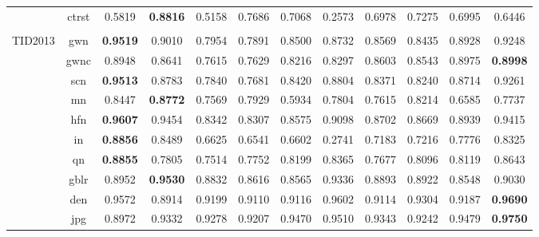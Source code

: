 \documentclass[11pt,a4paper]{article}
\begin{document}
\begin{table}[!htb]
\begin{scriptsize}
\begin{threeparttable}
\begin{tabular}{*{12}{c}}
& ctrst & 0.5819 & \cellcolor{red!25}\textbf{0.8816} & 0.5158 & 0.7686 & 0.7068 & \cellcolor{green!25}0.2573 & 0.6978 & 0.7275 & 0.6995 & 0.6446\\
\\
\multirow{24}{*}{TID2013} & gwn & \textbf{0.9519} & 0.9010 & \cellcolor{green!25}0.7954 & \cellcolor{green!25}0.7891 & \cellcolor{green!25}0.8500 & \cellcolor{green!25}0.8732 & \cellcolor{green!25}0.8569 & \cellcolor{green!25}0.8435 & 0.8928 & 0.9248\\
& gwnc & 0.8948 & 0.8641 & \cellcolor{green!25}0.7615 & \cellcolor{green!25}0.7629 & \cellcolor{green!25}0.8216 & \cellcolor{green!25}0.8297 & 0.8603 & 0.8543 & 0.8975 & \textbf{0.8998}\\
& scn & \textbf{0.9513} & \cellcolor{green!25}0.8783 & \cellcolor{green!25}0.7840 & \cellcolor{green!25}0.7681 & \cellcolor{green!25}0.8420 & \cellcolor{green!25}0.8804 & \cellcolor{green!25}0.8371 & \cellcolor{green!25}0.8240 & \cellcolor{green!25}0.8714 & 0.9261\\
& mn & 0.8447 & \cellcolor{red!25}\textbf{0.8772} & 0.7569 & 0.7929 & \cellcolor{green!25}0.5934 & 0.7804 & 0.7615 & 0.8214 & 0.6585 & 0.7737\\
& hfn & \textbf{0.9607} & 0.9454 & \cellcolor{green!25}0.8342 & \cellcolor{green!25}0.8307 & \cellcolor{green!25}0.8575 & 0.9098 & \cellcolor{green!25}0.8702 & \cellcolor{green!25}0.8669 & \cellcolor{green!25}0.8939 & 0.9415\\
& in & \textbf{0.8856} & 0.8489 & \cellcolor{green!25}0.6625 & \cellcolor{green!25}0.6541 & \cellcolor{green!25}0.6602 & \cellcolor{green!25}0.2741 & \cellcolor{green!25}0.7183 & \cellcolor{green!25}0.7216 & 0.7776 & 0.8325\\
& qn & \textbf{0.8855} & \cellcolor{green!25}0.7805 & \cellcolor{green!25}0.7514 & \cellcolor{green!25}0.7752 & 0.8199 & 0.8365 & \cellcolor{green!25}0.7677 & 0.8096 & 0.8119 & 0.8643\\
& gblr & 0.8952 & \cellcolor{red!25}\textbf{0.9530} & 0.8832 & 0.8616 & 0.8565 & 0.9336 & 0.8893 & 0.8922 & 0.8548 & 0.9030\\
& den & 0.9572 & \cellcolor{green!25}0.8914 & \cellcolor{green!25}0.9199 & \cellcolor{green!25}0.9110 & \cellcolor{green!25}0.9116 & 0.9602 & \cellcolor{green!25}0.9114 & \cellcolor{green!25}0.9304 & \cellcolor{green!25}0.9187 & \textbf{0.9690}\\
& jpg & \cellcolor{green!25}0.8972 & \cellcolor{green!25}0.9332 & \cellcolor{green!25}0.9278 & \cellcolor{green!25}0.9207 & \cellcolor{green!25}0.9470 & \cellcolor{green!25}0.9510 & \cellcolor{green!25}0.9343 & \cellcolor{green!25}0.9242 & \cellcolor{green!25}0.9479 & \textbf{0.9750}\\

\end{tabular}
\end{threeparttable}
\end{scriptsize}
\end{table}
\end{document}
